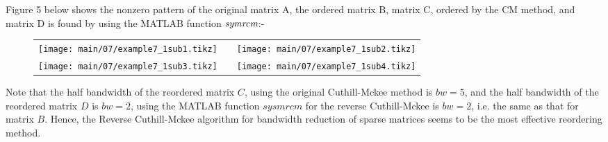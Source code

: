 \newpage
\noindent
\rmfamily
Figure 5 below shows the nonzero pattern of the original matrix A, the ordered
matrix B, matrix C, ordered by the CM method, and matrix D is found by using the
MATLAB function $\emph{symrcm}$:-
\begin{figure}[H]
  \begin{center}
    \tiny
    \begin{tabular}{ccc}
      \texttt{[image: main/07/example7\_1sub1.tikz]}&&
      \texttt{[image: main/07/example7\_1sub2.tikz]}\\
      \texttt{[image: main/07/example7\_1sub3.tikz]}&&
      \texttt{[image: main/07/example7\_1sub4.tikz]}\\
    \end{tabular}
  \end{center}
\end{figure}
\vskip 10pt
Note that the half bandwidth of the reordered matrix $C$, using the original
Cuthill-Mckee method is $bw =5$, and the half bandwidth of the reordered matrix
$D$ is $bw =2$, using the MATLAB function $sysmrcm$ for the reverse
Cuthill-Mckee is $bw =2$, i.e. the same as that for matrix $B$. Hence, the
Reverse Cuthill-Mckee algorithm for bandwidth reduction of sparse matrices seems
to be the most effective reordering method.
\vskip 6pt
\noindent
\newpage
\rmfamily
\vskip 12pt
\noindent
